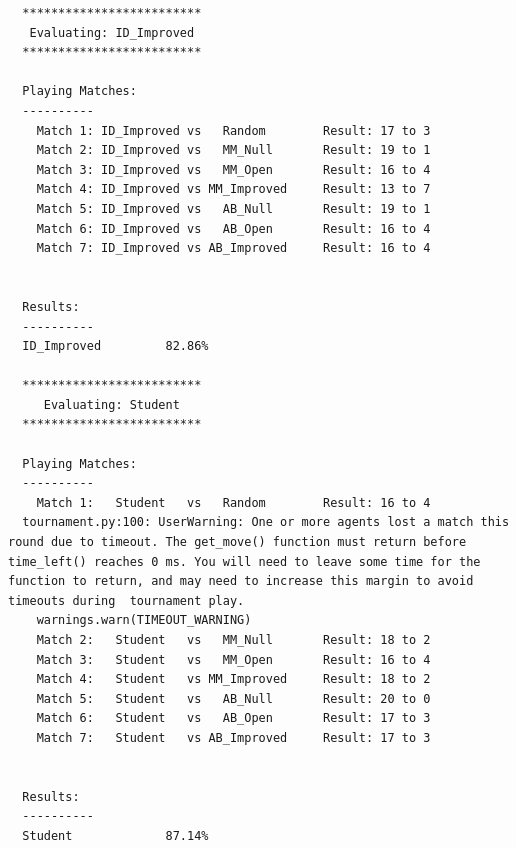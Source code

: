 \documentclass{article}
\begin{document}
\begin{verbatim}
  *************************
   Evaluating: ID_Improved
  *************************

  Playing Matches:
  ----------
    Match 1: ID_Improved vs   Random    	Result: 17 to 3
    Match 2: ID_Improved vs   MM_Null   	Result: 19 to 1
    Match 3: ID_Improved vs   MM_Open   	Result: 16 to 4
    Match 4: ID_Improved vs MM_Improved 	Result: 13 to 7
    Match 5: ID_Improved vs   AB_Null   	Result: 19 to 1
    Match 6: ID_Improved vs   AB_Open   	Result: 16 to 4
    Match 7: ID_Improved vs AB_Improved 	Result: 16 to 4


  Results:
  ----------
  ID_Improved         82.86%

  *************************
     Evaluating: Student
  *************************

  Playing Matches:
  ----------
    Match 1:   Student   vs   Random    	Result: 16 to 4
  tournament.py:100: UserWarning: One or more agents lost a match this round due to timeout. The get_move() function must return before time_left() reaches 0 ms. You will need to leave some time for the function to return, and may need to increase this margin to avoid timeouts during  tournament play.
    warnings.warn(TIMEOUT_WARNING)
    Match 2:   Student   vs   MM_Null   	Result: 18 to 2
    Match 3:   Student   vs   MM_Open   	Result: 16 to 4
    Match 4:   Student   vs MM_Improved 	Result: 18 to 2
    Match 5:   Student   vs   AB_Null   	Result: 20 to 0
    Match 6:   Student   vs   AB_Open   	Result: 17 to 3
    Match 7:   Student   vs AB_Improved 	Result: 17 to 3


  Results:
  ----------
  Student             87.14%
\end{verbatim}
\end{document}
